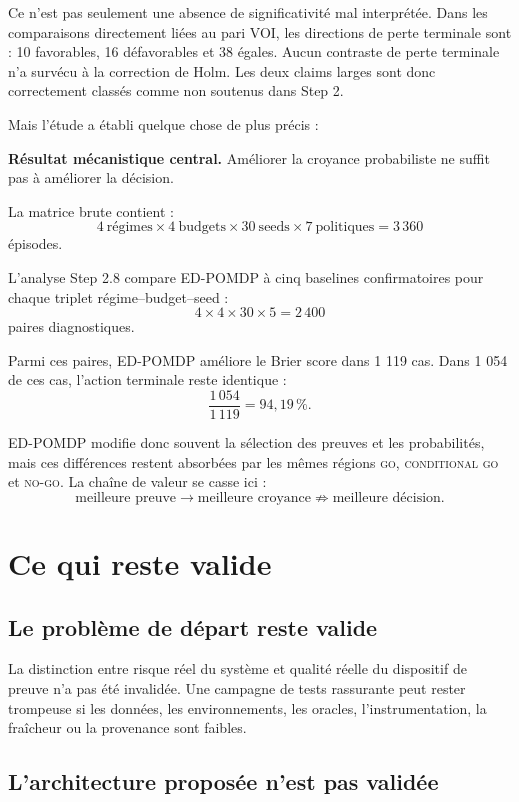 \documentclass[11pt,a4paper]{article}
\newcommand{\go}{\textsc{go}}
\newcommand{\cgo}{\textsc{conditional go}}
\newcommand{\nogo}{\textsc{no-go}}
\begin{document}
Ce n'est pas seulement une absence de significativité mal interprétée. Dans les comparaisons directement liées au pari VOI, les directions de perte terminale sont : 10 favorables, 16 défavorables et 38 égales. Aucun contraste de perte terminale n'a survécu à la correction de Holm. Les deux claims larges sont donc correctement classés comme non soutenus dans Step 2.

Mais l'étude a établi quelque chose de plus précis :

\begin{tcolorbox}[colback=softamber,colframe=orange!70!black,boxrule=0.8pt,arc=2mm]
\textbf{Résultat mécanistique central.} Améliorer la croyance probabiliste ne suffit pas à améliorer la décision.
\end{tcolorbox}

La matrice brute contient :
\[
4\ \text{régimes}\times 4\ \text{budgets}\times 30\ \text{seeds}\times 7\ \text{politiques}=3\,360
\]
épisodes.

L'analyse Step 2.8 compare ED-POMDP à cinq baselines confirmatoires pour chaque triplet régime--budget--seed :
\[
4\times 4\times 30\times 5=2\,400
\]
paires diagnostiques.

Parmi ces paires, ED-POMDP améliore le Brier score dans 1 119 cas. Dans 1 054 de ces cas, l'action terminale reste identique :
\[
\frac{1\,054}{1\,119}=94{,}19\,\%.
\]

ED-POMDP modifie donc souvent la sélection des preuves et les probabilités, mais ces différences restent absorbées par les mêmes régions \go{}, \cgo{} et \nogo{}. La chaîne de valeur se casse ici :
\[
\text{meilleure preuve}\rightarrow\text{meilleure croyance}\not\Rightarrow\text{meilleure décision}.
\]

\section{Ce qui reste valide}

\subsection{Le problème de départ reste valide}

La distinction entre risque réel du système et qualité réelle du dispositif de preuve n'a pas été invalidée. Une campagne de tests rassurante peut rester trompeuse si les données, les environnements, les oracles, l'instrumentation, la fraîcheur ou la provenance sont faibles.

\subsection{L'architecture proposée n'est pas validée}
\end{document}
